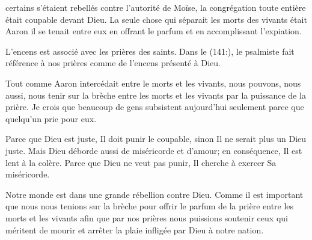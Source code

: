  certains s'étaient rebellés contre l'autorité de Moïse,
 la congrégation toute entière était coupable devant Dieu.
 La seule chose qui séparait les morts des vivants était Aaron
 \ocadr{}il se tenait entre eux en offrant le parfum
 et en accomplissant l'expiation.

L'encens est associé avec les prières des saints.
 Dans le (141:), le psalmiste
 fait référence à nos prières comme de l'encens présenté à Dieu.


Tout comme Aaron intercédait entre le morts et les vivants, nous pouvons,
 nous aussi, nous tenir sur la brèche entre les morts et les vivants
 par la puissance de la prière.
 Je crois que beaucoup de gens subsistent aujourd'hui
 seulement parce que quelqu'un prie pour eux.

Parce que Dieu est juste, Il doit punir le coupable,
 sinon Il ne serait plus un Dieu juste.
 Mais Dieu déborde aussi de miséricorde et d'amour;
 en conséquence, Il est lent à la colère.
 Parce que Dieu ne veut pas punir, Il cherche à exercer Sa miséricorde.

Notre monde est dans une grande rébellion contre Dieu.
 Comme il est important que nous nous tenions sur la brèche
 pour offrir le parfum de la prière entre les morts et les vivants
 \ocadr{}afin que par nos prières nous puissions soutenir
 ceux qui méritent de mourir et arrêter la plaie infligée
 par Dieu à notre nation. 

\dvrule






